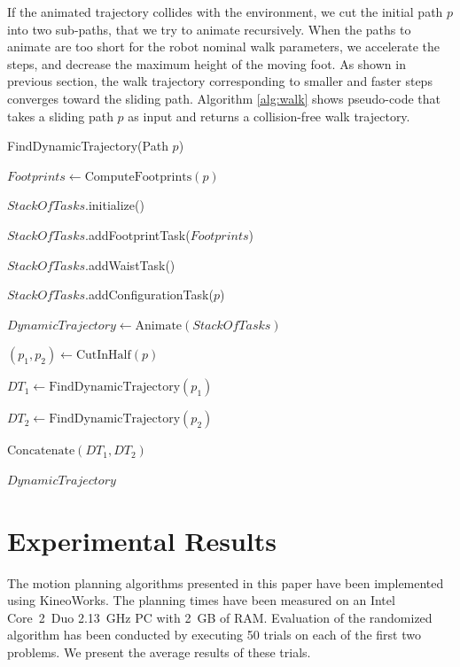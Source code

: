 \documentclass{article}
\begin{document}
If the animated  trajectory collides with the environment,  we cut the
initial  path   $p$  into  two   sub-paths,  that  we  try   to  animate
recursively. When the  paths to animate are too  short for the robot
nominal  walk parameters, we  accelerate the  steps, and  decrease the
maximum height of  the moving foot. As shown  in previous section, the
walk trajectory  corresponding to  smaller and faster  steps converges
toward the  sliding path.  Algorithm  \ref{alg:walk} shows pseudo-code
that takes  a sliding path $p$  as input and  returns a collision-free
walk trajectory.

\begin{algorithm}[h]
\caption{FindDynamicTrajectory(Path $p$)}
\label{alg:walk}
\begin{algorithmic}
\STATE $Footprints \leftarrow \text{ComputeFootprints}(p)$

\STATE $StackOfTasks$.initialize()

\STATE $StackOfTasks$.addFootprintTask($Footprints$)

\STATE $StackOfTasks$.addWaistTask()

\STATE $StackOfTasks$.addConfigurationTask($p$)

\STATE $DynamicTrajectory \leftarrow \text{Animate}(StackOfTasks)$


\STATE $(p_1,p_2) \leftarrow \text{CutInHalf}(p)$

\STATE $DT_1 \leftarrow \text{FindDynamicTrajectory}(p_1)$

\STATE $DT_2 \leftarrow \text{FindDynamicTrajectory}(p_2)$

\RETURN $\text{Concatenate}(DT_1,DT_2)$

\ELSE

\RETURN $DynamicTrajectory$

\ENDIF
\end{algorithmic}
\end{algorithm}





\section{Experimental Results}

\label{sec:exp}

The motion planning algorithms presented in this paper have been implemented
using KineoWorks\texttrademark \cite{laumond2006kcs}. The planning times have been measured
on an Intel Core~2~Duo 2.13~GHz PC with 2~GB of RAM. Evaluation of the
randomized algorithm has been conducted by executing 50 trials on each
of the first two problems. We present the average results of these trials.
\end{document}
